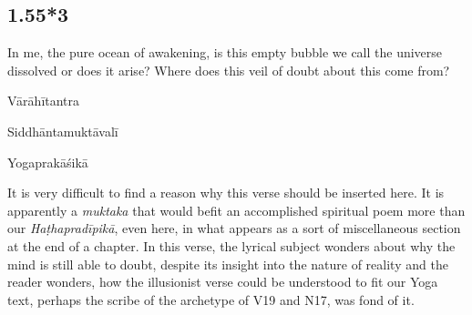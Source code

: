\begin{ekdosis}
\subsection*{1.55*3}
\begin{translation}[hp01_055_3]
In me, the pure ocean of awakening, is this empty bubble we call the universe dissolved or does it arise? Where does this veil of doubt about this come from?
\end{translation}

\begin{testimonia}[hp01_055_3]
Vārāhītantra

\begin{versinnote}
\end{versinnote}

Siddhāntamuktāvalī

\begin{versinnote}
\end{versinnote}

Yogaprakāśikā

\begin{versinnote}
\end{versinnote}

\end{testimonia}

\begin{philcomm}[hp01_055_3]
It is very difficult to find a reason why this verse should be inserted here. It is apparently a
\emph{muktaka} that would befit an accomplished spiritual poem more than our \emph{Haṭhapradīpikā},
even here, in what appears as a sort of miscellaneous section at the end of a chapter.  In this
verse, the lyrical subject wonders about why the mind is still able to doubt, despite its insight
into the nature of reality and the reader wonders, how the illusionist verse could be understood to
fit our Yoga text, perhaps the scribe of the archetype of V19 and N17, was fond of it.


\end{philcomm}
\end{ekdosis}
